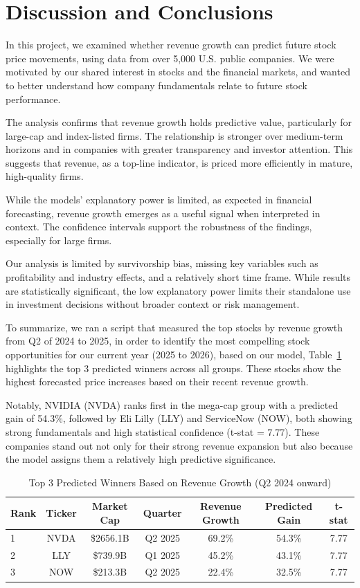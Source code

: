 \documentclass[11pt]{article}
\begin{document}
\section{Discussion and Conclusions}

In this project, we examined whether revenue growth can predict future stock price movements, using data from over 5,000 U.S. public companies. We were motivated by our shared interest in stocks and the financial markets, and wanted to better understand how company fundamentals relate to future stock performance.

The analysis confirms that revenue growth holds predictive value, particularly for large-cap and index-listed firms. The relationship is stronger over medium-term horizons and in companies with greater transparency and investor attention. This suggests that revenue, as a top-line indicator, is priced more efficiently in mature, high-quality firms.

While the models' explanatory power is limited, as expected in financial forecasting, revenue growth emerges as a useful signal when interpreted in context. The confidence intervals support the robustness of the findings, especially for large firms.

Our analysis is limited by survivorship bias, missing key variables such as profitability and industry effects, and a relatively short time frame. While results are statistically significant, the low explanatory power limits their standalone use in investment decisions without broader context or risk management.

To summarize, we ran a script that measured the top stocks by revenue growth from Q2 of 2024 to 2025, in order to identify the most compelling stock opportunities for our current year (2025 to 2026), based on our model, Table~\ref{tab:top-winners} highlights the top 3 predicted winners across all groups.
These stocks show the highest forecasted price increases based on their recent revenue growth.

Notably, NVIDIA (NVDA) ranks first in the mega-cap group with a predicted gain of 54.3\%, followed by Eli Lilly (LLY) and ServiceNow (NOW), both showing strong fundamentals and high statistical confidence (t-stat = 7.77). These companies stand out not only for their strong revenue expansion but also because the model assigns them a relatively high predictive significance. 

\begin{table}[!htbp]
\centering
\caption{Top 3 Predicted Winners Based on Revenue Growth (Q2 2024 onward)}
\label{tab:top-winners}
\begin{tabular}{lcccccc}
\toprule
Rank & Ticker & Market Cap & Quarter & Revenue Growth & Predicted Gain & t-stat \\
\midrule
1 & NVDA & \$2656.1B & Q2 2025 & 69.2\% & 54.3\% & 7.77 \\
2 & LLY  & \$739.9B  & Q1 2025 & 45.2\% & 43.1\% & 7.77 \\
3 & NOW  & \$213.3B  & Q2 2025 & 22.4\% & 32.5\% & 7.77 \\
\bottomrule
\end{tabular}
\end{table}

\FloatBarrier
\end{document}
